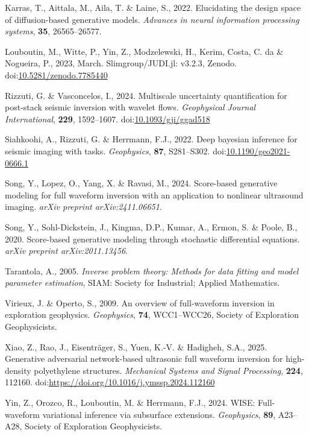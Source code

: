 \documentclass{IMAGE2025}
\begin{document}
\begin{CSLReferences}{1}{0}
Karras, T., Aittala, M., Aila, T. \& Laine, S., 2022. Elucidating the
design space of diffusion-based generative models. \emph{Advances in
neural information processing systems}, \textbf{35}, 26565--26577.

Louboutin, M., Witte, P., Yin, Z., Modzelewski, H., Kerim, Costa, C. da
\& Nogueira, P., 2023, March. Slimgroup/JUDI.jl: v3.2.3, Zenodo.
doi:\href{https://doi.org/10.5281/zenodo.7785440}{10.5281/zenodo.7785440}

Rizzuti, G. \& Vasconcelos, I., 2024. Multiscale uncertainty
quantification for post-stack seismic inversion with wavelet flows.
\emph{Geophysical Journal International}, \textbf{229}, 1592--1607.
doi:\href{https://doi.org/10.1093/gji/ggad518}{10.1093/gji/ggad518}

Siahkoohi, A., Rizzuti, G. \& Herrmann, F.J., 2022. Deep bayesian
inference for seismic imaging with tasks. \emph{Geophysics},
\textbf{87}, S281--S302.
doi:\href{https://doi.org/10.1190/geo2021-0666.1}{10.1190/geo2021-0666.1}

Song, Y., Lopez, O., Yang, X. \& Ravasi, M., 2024. Score-based
generative modeling for full waveform inversion with an application to
nonlinear ultrasound imaging. \emph{arXiv preprint arXiv:2411.06651}.

Song, Y., Sohl-Dickstein, J., Kingma, D.P., Kumar, A., Ermon, S. \&
Poole, B., 2020. Score-based generative modeling through stochastic
differential equations. \emph{arXiv preprint arXiv:2011.13456}.

Tarantola, A., 2005. \emph{Inverse problem theory: Methods for data
fitting and model parameter estimation}, SIAM: Society for Industrial;
Applied Mathematics.

Virieux, J. \& Operto, S., 2009. An overview of full-waveform inversion
in exploration geophysics. \emph{Geophysics}, \textbf{74}, WCC1--WCC26,
Society of Exploration Geophysicists.

Xiao, Z., Rao, J., Eisenträger, S., Yuen, K.-V. \& Hadigheh, S.A., 2025.
Generative adversarial network-based ultrasonic full waveform inversion
for high-density polyethylene structures. \emph{Mechanical Systems and
Signal Processing}, \textbf{224}, 112160.
doi:\url{https://doi.org/10.1016/j.ymssp.2024.112160}

Yin, Z., Orozco, R., Louboutin, M. \& Herrmann, F.J., 2024. WISE:
Full-waveform variational inference via subsurface extensions.
\emph{Geophysics}, \textbf{89}, A23--A28, Society of Exploration
Geophysicists.

\end{CSLReferences}


\end{document}
